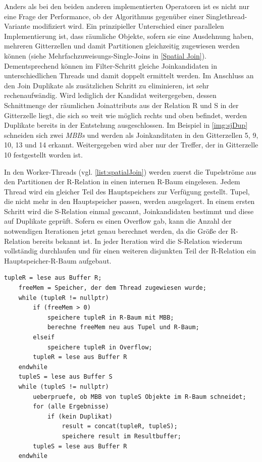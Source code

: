 \documentclass[a4paper,12pt,twoside]{article}
\newcommand{\Fb}[1]{\textit{#1}} %
\begin{document}
Anders als bei den beiden anderen implementierten Operatoren ist es nicht nur eine Frage der Performance, ob der Algorithmus gegenüber einer Singlethread-Variante modifiziert wird. Ein prinzipieller Unterschied einer parallelen Implementierung ist, dass räumliche Objekte, sofern sie eine Ausdehnung haben, mehreren Gitterzellen und damit Partitionen gleichzeitig zugewiesen werden können (siehe Mehrfachzuweisungs-Single-Joins in \autoref{Spatial Join}). Dementsprechend können im Filter-Schritt gleiche Joinkandidaten in unterschiedlichen Threads und damit doppelt ermittelt werden. Im Anschluss an den Join Duplikate als zusätzlichen Schritt zu eliminieren, ist sehr rechenaufwändig. Wird lediglich der Kandidat weitergegeben, dessen Schnittmenge der räumlichen Joinattributs aus der Relation R und S in der Gitterzelle liegt, die sich so weit wie möglich rechts und oben befindet, werden Duplikate bereits in der Entstehung ausgeschlossen. Im Beispiel in \autoref{img:sjDup} schneiden sich zwei \Fb{MBBs} und werden als Joinkanditaten in den Gitterzellen 5, 9, 10, 13 und 14 erkannt. Weitergegeben wird aber nur der Treffer, der in Gitterzelle 10 festgestellt worden ist.

In den Worker-Threads (vgl. \autoref{list:spatialJoin}) werden zuerst die Tupelströme aus den Partitionen der R-Relation in einen internen R-Baum eingelesen. Jedem Thread wird ein gleicher Teil des Hauptspeichers zur Verfügung gestellt. Tupel, die nicht mehr in den Hauptspeicher passen, werden ausgelagert. In einem ersten Schritt wird die S-Relation einmal gescannt, Joinkandidaten bestimmt und diese auf Duplikate geprüft. Sofern es einen Overflow gab, kann die Anzahl der notwendigen Iterationen jetzt genau berechnet werden, da die Größe der R-Relation bereits bekannt ist. In jeder Iteration wird die S-Relation wiederum vollständig durchlaufen und für einen weiteren disjunkten Teil der R-Relation ein Hauptspeicher-R-Baum aufgebaut.

\begin{minipage}{0.95\textwidth}
	\begin{lstlisting}[caption={Spatial-Join: Worker.}, label=list:spatialJoin]
	tupleR = lese aus Buffer R;
	freeMem = Speicher, der dem Thread zugewiesen wurde; 
	while (tupleR != nullptr)
		if (freeMem > 0)
			speichere tupleR in R-Baum mit MBB;
			berechne freeMem neu aus Tupel und R-Baum;
		elseif
			speichere tupleR in Overflow;
		tupleR = lese aus Buffer R 
	endwhile
	tupleS = lese aus Buffer S
	while (tupleS != nullptr)
		ueberpruefe, ob MBB von tupleS Objekte im R-Baum schneidet;
		for (alle Ergebnisse)
			if (kein Duplikat)
				result = concat(tupleR, tupleS);
				speichere result im Resultbuffer;
		tupleS = lese aus Buffer R
	endwhile
	\end{lstlisting}
\end{minipage}
\end{document}
